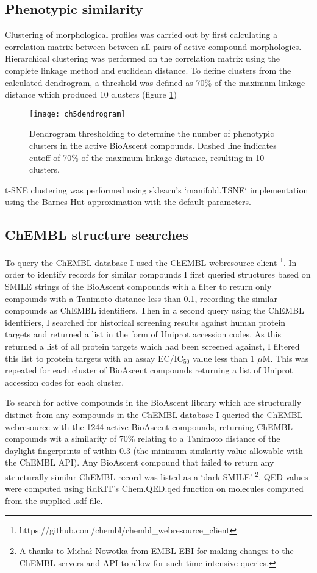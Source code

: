 \documentclass[a4paper,11pt,twoside,openright]{scrbook}
\begin{document}
\subsection{Phenotypic similarity}
Clustering of morphological profiles was carried out by first calculating a correlation matrix between between all pairs of active compound morphologies.
Hierarchical clustering was performed on the correlation matrix using the complete linkage method and euclidean distance.
To define clusters from the calculated dendrogram, a threshold was defined as 70\% of the maximum linkage distance which produced 10 clusters (figure \ref{figure:dendrogram_cut})

\begin{figure}
    \captionsetup{width=0.8\textwidth}
    \caption[Dendrogram threshold to determine clusters]{
Dendrogram thresholding to determine the number of phenotypic clusters in the active BioAscent compounds.
Dashed line indicates cutoff of 70\% of the maximum linkage distance, resulting in 10 clusters.
}
    \texttt{[image: ch5dendrogram]}
    \label{figure:dendrogram_cut}
\end{figure}

t-SNE clustering was performed using sklearn's `manifold.TSNE` implementation using the Barnes-Hut approximation with the default parameters.

\subsection{ChEMBL structure searches}
To query the ChEMBL database I used the ChEMBL webresource client \footnote{https://github.com/chembl/chembl\_webresource\_client}.
In order to identify records for similar compounds I first queried structures based on SMILE strings of the BioAscent compounds with a filter to return only compounds with a Tanimoto distance less than 0.1, recording the similar compounds as ChEMBL identifiers.
Then in a second query using the ChEMBL identifiers, I searched for historical screening results against human protein targets and returned a list in the form of Uniprot accession codes.
As this returned a list of all protein targets which had been screened against, I filtered this list to protein targets with an assay EC/IC$_{50}$ value less than 1 $\mu$M.
This was repeated for each cluster of BioAscent compounds returning a list of Uniprot accession codes for each cluster.

To search for active compounds in the BioAscent library which are structurally distinct from any compounds in the ChEMBL database I queried the ChEMBL webresource with the 1244 active BioAscent compounds, returning ChEMBL compounds wit a similarity of 70\% relating to a Tanimoto distance of the daylight fingerprints of within 0.3 (the minimum similarity value allowable with the ChEMBL API).
Any BioAscent compound that failed to return any structurally similar ChEMBL record was listed as a `dark SMILE'
\footnote{A thanks to Michał Nowotka from EMBL-EBI for making changes to the ChEMBL servers and API to allow for such time-intensive queries.}.
QED values were computed using RdKIT's Chem.QED.qed function on molecules computed from the supplied .sdf file.
\end{document}
